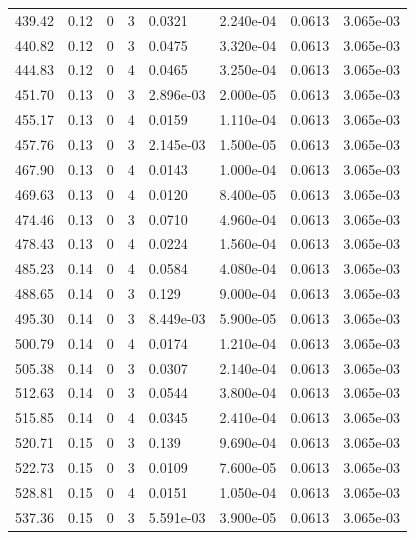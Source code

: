 \documentclass[preview]{standalone}
\begin{document}
{{{{\begin{tabular}{L{1.2cm}C{1.2cm} C{0.3cm}C{0.5cm} C{1.4cm}C{1.4cm} C{1.4cm}C{1.4cm}}
  439.42  &  0.12  & 0     &  3 &  0.0321  & 2.240e-04  & 0.0613 &  3.065e-03   \\ 
  440.82  &  0.12  & 0     &  3 &  0.0475  & 3.320e-04  & 0.0613 &  3.065e-03   \\ 
  444.83  &  0.12  & 0     &  4 &  0.0465  & 3.250e-04  & 0.0613 &  3.065e-03   \\ 
  451.70  &  0.13  & 0     &  3 &  2.896e-03  & 2.000e-05  & 0.0613 &  3.065e-03   \\ 
  455.17  &  0.13  & 0     &  4 &  0.0159  & 1.110e-04  & 0.0613 &  3.065e-03   \\ 
  457.76  &  0.13  & 0     &  3 &  2.145e-03  & 1.500e-05  & 0.0613 &  3.065e-03   \\ 
  467.90  &  0.13  & 0     &  4 &  0.0143  & 1.000e-04  & 0.0613 &  3.065e-03   \\ 
  469.63  &  0.13  & 0     &  4 &  0.0120  & 8.400e-05  & 0.0613 &  3.065e-03   \\ 
  474.46  &  0.13  & 0     &  3 &  0.0710  & 4.960e-04  & 0.0613 &  3.065e-03   \\ 
  478.43  &  0.13  & 0     &  4 &  0.0224  & 1.560e-04  & 0.0613 &  3.065e-03   \\ 
  485.23  &  0.14  & 0     &  4 &  0.0584  & 4.080e-04  & 0.0613 &  3.065e-03   \\ 
  488.65  &  0.14  & 0     &  3 &  0.129  & 9.000e-04  & 0.0613 &  3.065e-03   \\ 
  495.30  &  0.14  & 0     &  3 &  8.449e-03  & 5.900e-05  & 0.0613 &  3.065e-03   \\ 
  500.79  &  0.14  & 0     &  4 &  0.0174  & 1.210e-04  & 0.0613 &  3.065e-03   \\ 
  505.38  &  0.14  & 0     &  3 &  0.0307  & 2.140e-04  & 0.0613 &  3.065e-03   \\ 
  512.63  &  0.14  & 0     &  3 &  0.0544  & 3.800e-04  & 0.0613 &  3.065e-03   \\ 
  515.85  &  0.14  & 0     &  4 &  0.0345  & 2.410e-04  & 0.0613 &  3.065e-03   \\ 
  520.71  &  0.15  & 0     &  3 &  0.139  & 9.690e-04  & 0.0613 &  3.065e-03   \\ 
  522.73  &  0.15  & 0     &  3 &  0.0109  & 7.600e-05  & 0.0613 &  3.065e-03   \\ 
  528.81  &  0.15  & 0     &  4 &  0.0151  & 1.050e-04  & 0.0613 &  3.065e-03   \\ 
  537.36  &  0.15  & 0     &  3 &  5.591e-03  & 3.900e-05  & 0.0613 &  3.065e-03   \\ 

\end{tabular}}}}}
\end{document}
